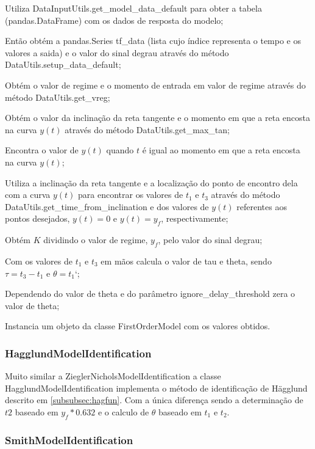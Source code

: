 \begin{alineas}
    \item Utiliza DataInputUtils.get\_model\_data\_default para obter a tabela (pandas.DataFrame) com os dados de
    resposta do modelo;
    \item Então obtém a pandas.Series tf\_data (lista cujo índice representa o tempo e os valores a saida)
    e o valor do sinal degrau através do método DataUtils.setup\_data\_default;
    \item Obtém o valor de regime e o momento de entrada em valor de regime através do método
    DataUtils.get\_vreg;
    \item Obtém o valor da inclinação da reta tangente e o momento em que a reta encosta na curva $y(t)$
    através do método DataUtils.get\_max\_tan;
    \item Encontra o valor de $y(t)$ quando $t$ é igual ao momento em que a reta encosta na curva $y(t)$;
    \item Utiliza a inclinação da reta tangente e a localização do ponto de encontro dela com a curva $y(t)$
    para encontrar os valores de $t_1$ e $t_3$ através do método
    DataUtils.get\_time\_from\_inclination e dos valores de $y(t)$ referentes aos pontos desejados,
    $y(t) = 0$ e $y(t) = y_f$, respectivamente;
    \item Obtém $K$ dividindo o valor de regime, $y_f$, pelo valor do sinal degrau;
    \item Com os valores de $t_1$ e $t_3$ em mãos calcula o valor de tau e theta,
    sendo $\tau = t_3 - t_1$ e $\theta = t_1$`;
    \item Dependendo do valor de theta e do parâmetro ignore\_delay\_threshold zera o valor de theta;
    \item Instancia um objeto da classe FirstOrderModel com os valores obtidos.
\end{alineas}

\subsubsection{HagglundModelIdentification}

Muito similar a ZieglerNicholsModelIdentification a classe HagglundModelIdentification implementa o método de
identificação de Hägglund descrito em \ref{subsubsec:hagfun}.
Com a única diferença sendo a determinação de $t2$ baseado em $y_f*0.632$ e o calculo de $\theta$ baseado em $t_1$ e
$t_2$.

\subsubsection{SmithModelIdentification}

